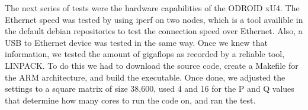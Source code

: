 The next series of tests were the hardware capabilities of the ODROID xU4. The Ethernet speed was tested by using iperf on two nodes, which is a tool availible in the default debian repositories to test the connection speed over Ethernet. Also, a USB to Ethernet device was tested in the same way. Once we knew that information, we tested the amount of gigaflops as recorded by a reliable tool, LINPACK. To do this we had to download the source code, create a Makefile for the ARM architecture, and build the executable. Once done, we adjusted the settings to a square matrix of size 38,600, used 4 and 16 for the P and Q values that determine how many cores to run the code on, and ran the test. \

